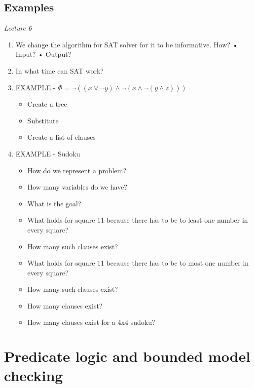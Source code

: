 \documentclass[fleqn]{article}
\begin{document}
\subsection{Examples}
\textit{Lecture 6}
\begin{enumerate}
    \item We change the algorithm for SAT solver for it to be informative. How?
    • Input?
    • Output?
    \item In what time can SAT work?
    \item EXAMPLE - $\Phi = \neg (( x \vee \neg y) \wedge \neg (x \wedge \neg (y \wedge z)))$
    \begin{itemize}
        \item Create a tree
        \item Substitute
        \item Create a list of clauses
    \end{itemize}
    \item EXAMPLE - Sudoku
    \begin{itemize}
        \item How do we represent a problem?
        \item How many variables do we have?
        \item What is the goal?
        \item What holds for square 11 because there has to be to least one number in every square?
        \item How many such clauses exist?
        \item What holds for square 11 because there has to be to most one number in every square?
        \item How many such clauses exist?
        \item How many clauses exist?
        \item How many clauses exist for a 4x4 sudoku?
    \end{itemize}
\end{enumerate}


\section{Predicate logic and bounded model checking}
\end{document}
